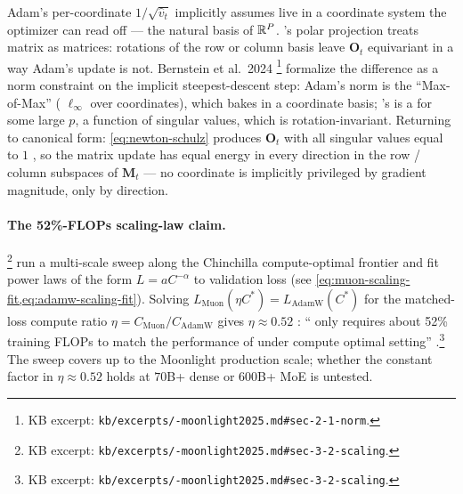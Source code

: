 \begin{intuition}
\label{intuit:muon-vs-adamw}
Adam's per-coordinate $1/\sqrt{\hat{v}_t}$ implicitly assumes
 live in a coordinate system the optimizer can read off ---
the natural basis of $\mathbb{R}^P$. 's polar projection treats matrix
 as matrices: rotations of the row or column basis leave
$\mathbf{O}_t$ equivariant in a way Adam's update is not. Bernstein
et al.\ 2024 \citep[\S 2.1]{muon-moonlight2025}\protect\footnote{KB
excerpt: \texttt{kb/excerpts/-moonlight2025.md\#sec-2-1-norm}.}
formalize the difference as a norm constraint on the implicit
steepest-descent step: Adam's norm is the ``Max-of-Max'' (
$\ell_\infty$ over coordinates), which bakes in a coordinate basis;
's is a  for some large $p$, a function of
singular values, which is rotation-invariant. Returning to canonical
form: \cref{eq:newton-schulz} produces $\mathbf{O}_t$ with all
singular values equal to $1$ \citep[\S
2.1]{muon-moonlight2025}, so the matrix update has equal energy in
every direction in the row / column subspaces of $\mathbf{M}_t$ ---
no coordinate is implicitly privileged by gradient magnitude, only
by direction.
\end{intuition}

\paragraph{The 52\%-FLOPs scaling-law claim.}
\citet[\S 3.2]{muon-moonlight2025}\footnote{KB excerpt:
\texttt{kb/excerpts/-moonlight2025.md\#sec-3-2-scaling}.} run a
multi-scale sweep along the Chinchilla compute-optimal frontier and
fit power laws of the form $L = a C^{-\alpha}$ to validation loss
(see \cref{eq:muon-scaling-fit,eq:adamw-scaling-fit}). Solving
$L_{\mathrm{Muon}}(\eta C^*) = L_{\mathrm{AdamW}}(C^*)$ for the
matched-loss compute ratio $\eta = C_{\mathrm{Muon}} /
C_{\mathrm{AdamW}}$ gives $\eta \approx 0.52$
\citep[Figure 1a]{muon-moonlight2025}: `` only requires about
52\% training FLOPs to match the performance of  under
compute optimal setting'' \citep[\S
3.2]{muon-moonlight2025}.\footnote{KB excerpt:
\texttt{kb/excerpts/-moonlight2025.md\#sec-3-2-scaling}.} The
sweep covers up to the Moonlight production scale; whether the
constant factor in $\eta \approx 0.52$ holds at $70$B+ dense or
$600$B+ MoE is untested.


